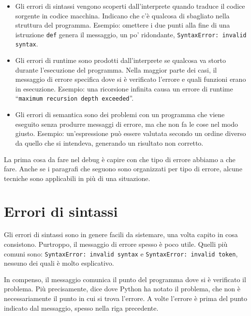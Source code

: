\documentclass[10pt]{book}
\begin{document}
\begin{itemize}

\item Gli errori di sintassi vengono scoperti dall'interprete quando traduce il codice sorgente in codice macchina. Indicano che c'è qualcosa di sbagliato nella struttura del programma. Esempio: omettere i due punti alla fine di una istruzione {\tt def} genera il messaggio, un po' ridondante, {\tt SyntaxError: invalid syntax}.

\item Gli errori di runtime sono prodotti dall'interprete se qualcosa va storto durante l'esecuzione del programma. Nella maggior parte dei casi, il messaggio di errore specifica dove si è verificato l'errore e quali funzioni erano in esecuzione. Esempio: una ricorsione infinita causa un errore di runtime ``{\tt maximum recursion depth exceeded}''.

\item Gli errori di semantica sono dei problemi con un programma che viene eseguito senza produrre messaggi di errore, ma che non fa le cose nel modo giusto. Esempio: un'espressione può essere valutata secondo un ordine diverso da quello che si intendeva, generando un risultato non corretto.
\end{itemize}

La prima cosa da fare nel debug è capire con che tipo di errore abbiamo a che fare. Anche se i paragrafi che seguono sono organizzati per tipo di errore, alcune tecniche sono applicabili in più di una situazione.


\section{Errori di sintassi}

Gli errori di sintassi sono in genere facili da sistemare, una volta capito in cosa consistono. Purtroppo, il messaggio di errore spesso è poco utile. Quelli più comuni sono: {\tt SyntaxError: invalid syntax} e
{\tt SyntaxError: invalid token}, nessuno dei quali è molto esplicativo.

In compenso, il messaggio comunica il punto del programma dove si è verificato il problema. Più precisamente, dice dove Python ha notato il problema, che non è necessariamente il punto in cui si trova l'errore.
A volte l'errore è prima del punto indicato dal messaggio, spesso nella riga precedente.
\end{document}
